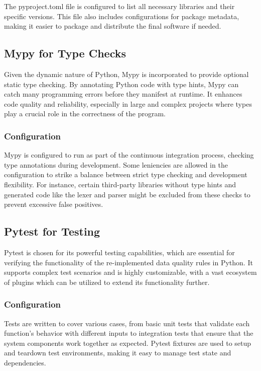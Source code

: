 The pyproject.toml file is configured to list all necessary libraries and their specific versions. This file also includes configurations for package metadata, making it easier to package and distribute the final software if needed.

\subsection{Mypy for Type Checks}

Given the dynamic nature of Python, Mypy is incorporated to provide optional static type checking. By annotating Python code with type hints, Mypy can catch many programming errors before they manifest at runtime. It enhances code quality and reliability, especially in large and complex projects where types play a crucial role in the correctness of the program.

\subsubsection{Configuration}
Mypy is configured to run as part of the continuous integration process, checking type annotations during development. Some leniencies are allowed in the configuration to strike a balance between strict type checking and development flexibility. For instance, certain third-party libraries without type hints and generated code like the lexer and parser might be excluded from these checks to prevent excessive false positives.

\subsection{Pytest for Testing}

Pytest is chosen for its powerful testing capabilities, which are essential for verifying the functionality of the re-implemented data quality rules in Python. It supports complex test scenarios and is highly customizable, with a vast ecosystem of plugins which can be utilized to extend its functionality further.

\subsubsection{Configuration}

Tests are written to cover various cases, from basic unit tests that validate each function's behavior with different inputs to integration tests that ensure that the system components work together as expected. Pytest fixtures are used to setup and teardown test environments, making it easy to manage test state and dependencies.

